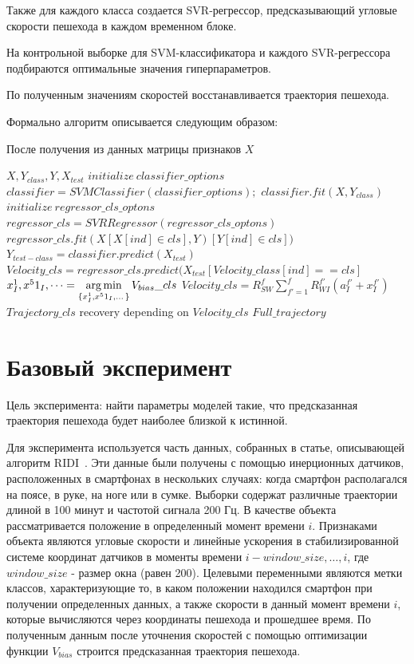 \documentclass[12pt,twoside]{article}
\begin{document}
Также для каждого класса создается SVR-регрессор, предсказывающий угловые скорости пешехода в каждом временном блоке. 

На контрольной выборке для SVM-классификатора и каждого SVR-регрессора подбираются оптимальные значения гиперпараметров.

По полученным значениям скоростей восстанавливается траектория пешехода.

Формально алгоритм описывается следующим образом: 

После получения из данных матрицы признаков $X$

\begin{algorithmic}[1]
\REQUIRE $X, Y_{class}, Y, X_{test}$
\STATE $initialize ~ classifier\_options$
\STATE $classifier = SVMClassifier(classifier\_options);$
\STATE $classifier.fit(X, Y_{class})$
\STATE $initialize ~ regressor\_cls\_optons$
\STATE $regressor\_cls = SVRRegressor(regressor\_cls\_optons)$
\STATE $regressor\_cls.fit(X[X[ind] \in cls], Y)[Y[ind] \in cls])$
\ENDFOR
\STATE $Y_{test-class} = classifier.predict(X_{test})$
\STATE $Velocity\_cls = regressor\_cls.predict(X_{test}
[Velocity\_class[ind] == cls]$
\STATE $x^1_I, x^51_I,\dots = \argmin_{\{x^1_I, x^51_I,\dots\}}V_{bias}\_cls$
\STATE $Velocity\_cls = R_{SW}^f\sum_{f'=1}^f R_{WI}^{f'}(a_I^{f'}+x_I^{f'})$
\STATE $Trajectory\_cls$ recovery depending on $Velocity\_cls$
\ENDFOR
\RETURN $Full\_trajectory$
\end{algorithmic}

\section{Базовый эксперимент}

Цель эксперимента: найти параметры моделей такие, что предсказанная траектория пешехода будет наиболее близкой к истинной.

Для эксперимента используется часть данных, собранных в статье, описывающей алгоритм RIDI~\cite{journals/corr/abs-1712-09004}. Эти данные были получены с помощью инерционных датчиков, расположенных в смартфонах в нескольких случаях: когда смартфон располагался на поясе, в руке, на ноге или в сумке. Выборки содержат различные траектории длиной в 100 минут и частотой сигнала 200 Гц. В качестве объекта рассматривается положение в определенный момент времени $i$. Признаками объекта являются угловые скорости и линейные ускорения в стабилизированной системе координат датчиков в моменты времени $i-window\_size, \dots, i$, где $window\_size$ - размер окна (равен 200). Целевыми переменными являются метки классов, характеризующие то, в каком положении находился смартфон при получении определенных данных, а также скорости в данный момент времени $i$, которые вычисляются через координаты пешехода и прошедшее время. По полученным данным после уточнения скоростей с помощью оптимизации функции  $V_{bias}$ строится предсказанная траектория пешехода.
\end{document}
